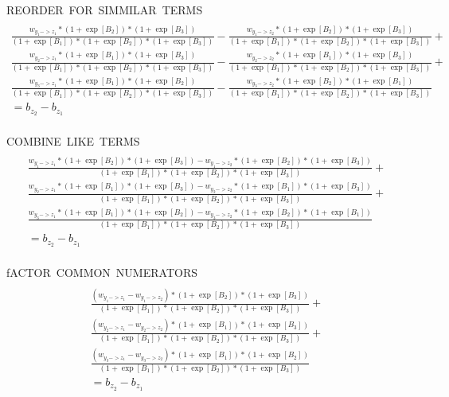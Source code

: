 \documentclass{article}
\begin{document}
\hbox{REORDER FOR SIMMILAR TERMS}
\begin{multline}
    \\
    \frac{w_{y_1->z_1} * (1+\exp[B_2]) * (1+\exp[B_3])}
        {(1+\exp[B_1]) * (1+\exp[B_2]) * (1+\exp[B_3])} -
    \frac{w_{y_1->z_2} * (1+\exp[B_2]) * (1+\exp[B_3])}
        {(1+\exp[B_1]) * (1+\exp[B_2]) * (1+\exp[B_3])} + \\
    \frac{w_{y_2->z_1} * (1+\exp[B_1]) * (1+\exp[B_3])}
        {(1+\exp[B_1]) * (1+\exp[B_2]) * (1+\exp[B_3])} -
    \frac{w_{y_2->z_2} * (1+\exp[B_1]) * (1+\exp[B_3])}
        {(1+\exp[B_1]) * (1+\exp[B_2]) * (1+\exp[B_3])} + \\
    \frac{w_{y_3->z_1} * (1+\exp[B_1]) * (1+\exp[B_2])}
        {(1+\exp[B_1]) * (1+\exp[B_2]) * (1+\exp[B_3])} -
    \frac{w_{y_3->z_2} * (1+\exp[B_2]) * (1+\exp[B_1])}
        {(1+\exp[B_1]) * (1+\exp[B_2]) * (1+\exp[B_3])}
    \\=b_{z_2} - b_{z_1}
    \\
\end{multline}

\hbox{COMBINE LIKE TERMS}
\begin{multline}
    \\
    \frac{w_{y_1->z_1} * (1+\exp[B_2]) * (1+\exp[B_3]) - 
        w_{y_1->z_2} * (1+\exp[B_2]) * (1+\exp[B_3])}
        {(1+\exp[B_1]) * (1+\exp[B_2]) * (1+\exp[B_3])} +\\
    \frac{w_{y_2->z_1} * (1+\exp[B_1]) * (1+\exp[B_3]) - 
        w_{y_2->z_2} * (1+\exp[B_1]) * (1+\exp[B_3])}
        {(1+\exp[B_1]) * (1+\exp[B_2]) * (1+\exp[B_3])} +\\
    \frac{w_{y_3->z_1} * (1+\exp[B_1]) * (1+\exp[B_2]) -
        w_{y_3->z_2} * (1+\exp[B_2]) * (1+\exp[B_1])} 
        {(1+\exp[B_1]) * (1+\exp[B_2]) * (1+\exp[B_3])}
    \\=b_{z_2} - b_{z_1}
    \\
\end{multline}

\hbox{fACTOR COMMON NUMERATORS}
\begin{multline}
    \\
    \frac{(w_{y_1->z_1} - w_{y_1->z_2}) * (1+\exp[B_2]) * (1+\exp[B_3])}
        {(1+\exp[B_1]) * (1+\exp[B_2]) * (1+\exp[B_3])} +\\
    \frac{(w_{y_2->z_1} - w_{y_2->z_2}) * (1+\exp[B_1]) * (1+\exp[B_3])}
        {(1+\exp[B_1]) * (1+\exp[B_2]) * (1+\exp[B_3])} +\\
    \frac{(w_{y_3->z_1} - w_{y_3->z_2}) * (1+\exp[B_1]) * (1+\exp[B_2])} 
        {(1+\exp[B_1]) * (1+\exp[B_2]) * (1+\exp[B_3])}
    \\=b_{z_2} - b_{z_1}
    \\
\end{multline}
\end{document}

